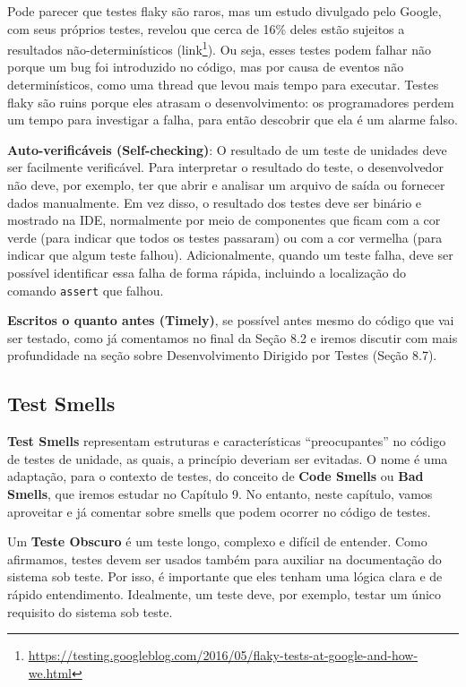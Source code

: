 \documentclass[
  11pt,
  twoside]{book}
\newcommand{\passthrough}[1]{#1}
\DeclareRobustCommand{\href}[2]{#2\footnote{\url{#1}}}
\begin{document}
Pode parecer que testes flaky são raros, mas um estudo divulgado pelo
Google, com seus próprios testes, revelou que cerca de 16\% deles estão
sujeitos a resultados não-determinísticos
(\href{https://testing.googleblog.com/2016/05/flaky-tests-at-google-and-how-we.html}{link}).
Ou seja, esses testes podem falhar não porque um bug foi introduzido no
código, mas por causa de eventos não determinísticos, como uma thread
que levou mais tempo para executar. Testes flaky são ruins porque eles
atrasam o desenvolvimento: os programadores perdem um tempo para
investigar a falha, para então descobrir que ela é um alarme falso.

\textbf{Auto-verificáveis (Self-checking)}: O resultado de um teste de
unidades deve ser facilmente verificável. Para interpretar o resultado
do teste, o desenvolvedor não deve, por exemplo, ter que abrir e
analisar um arquivo de saída ou fornecer dados manualmente. Em vez
disso, o resultado dos testes deve ser binário e mostrado na IDE,
normalmente por meio de componentes que ficam com a cor verde (para
indicar que todos os testes passaram) ou com a cor vermelha (para
indicar que algum teste falhou). Adicionalmente, quando um teste falha,
deve ser possível identificar essa falha de forma rápida, incluindo a
localização do comando \passthrough{\lstinline!assert!} que falhou.

\textbf{Escritos o quanto antes (Timely)}, se possível antes mesmo do
código que vai ser testado, como já comentamos no final da Seção 8.2 e
iremos discutir com mais profundidade na seção sobre Desenvolvimento
Dirigido por Testes (Seção 8.7).

\hypertarget{test-smells}{%
\subsection{Test Smells}\label{test-smells}}


\textbf{Test Smells} representam estruturas e características
``preocupantes'' no código de testes de unidade, as quais, a princípio
deveriam ser evitadas. O nome é uma adaptação, para o contexto de
testes, do conceito de \textbf{Code Smells} ou \textbf{Bad Smells}, que
iremos estudar no Capítulo 9. No entanto, neste capítulo, vamos
aproveitar e já comentar sobre smells que podem ocorrer no código de
testes.

Um \textbf{Teste Obscuro} é um teste longo, complexo e difícil de
entender. Como afirmamos, testes devem ser usados também para auxiliar
na documentação do sistema sob teste. Por isso, é importante que eles
tenham uma lógica clara e de rápido entendimento. Idealmente, um teste
deve, por exemplo, testar um único requisito do sistema sob teste.
\end{document}
